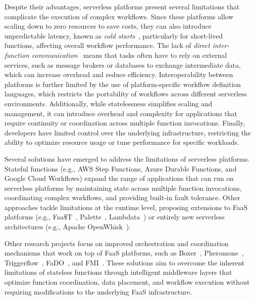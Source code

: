 Despite their advantages, serverless platforms present several limitations that complicate the execution of complex workflows. Since these platforms allow scaling down to zero resources to save costs, they can also introduce unpredictable latency, known as \textit{cold starts}~\cite{cold_starts_surey}, particularly for short-lived functions, affecting overall workflow performance. The lack of \textit{direct inter-function communication}~\cite{serverless_computing_drawbacks_survey_rw1} means that tasks often have to rely on external services, such as message brokers or databases to exchange intermediate data, which can increase overhead and reduce efficiency. Interoperability between platforms is further limited by the use of platform-specific workflow definition languages, which restricts the portability of workflows across different serverless environments. Additionally, while statelessness simplifies scaling and management, it can introduce overhead and complexity for applications that require continuity or coordination across multiple function invocations. Finally, developers have limited control over the underlying infrastructure, restricting the ability to optimize resource usage or tune performance for specific workloads.

Several solutions have emerged to address the limitations of serverless platforms. Stateful functions (e.g., AWS Step Functions\cite{aws_step_functions}, Azure Durable Functions\cite{azure_durable_functions}, and Google Cloud Workflows\cite{google_cloud_workflows}) expand the range of applications that can run on serverless platforms by maintaining state across multiple function invocations, coordinating complex workflows, and providing built-in fault tolerance. Other approaches tackle limitations at the runtime level, proposing extensions to FaaS platforms (e.g., Faa\$T~\cite{faast_caching}, Palette~\cite{palette_load_balancing}, Lambdata~\cite{lambdata_intents}) or entirely new serverless architectures (e.g., Apache OpenWhisk~\cite{open_whisk}). 

Other research projects focus on improved orchestration and coordination mechanisms that work on top of FaaS platforms, such as Boxer~\cite{boxer}, Pheromone~\cite{pheromone}, Triggerflow~\cite{triggerflow}, FaDO~\cite{fado}, and FMI~\cite{fmi}. These solutions aim to overcome the inherent limitations of stateless functions through intelligent middleware layers that optimize function coordination, data placement, and workflow execution without requiring modifications to the underlying FaaS infrastructure.

